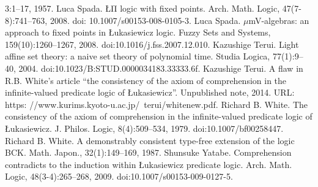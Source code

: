 3:1–17, 1957.
 Luca Spada. ŁΠ logic with fixed points. Arch. Math. Logic, 47(7-8):741–763, 2008. doi:
10.1007/s00153-008-0105-3.
 Luca Spada. \ensuremath{\mu}mV-algebras: an approach to fixed points in Łukasiewicz logic. Fuzzy Sets and
Systems, 159(10):1260–1267, 2008. doi:10.1016/j.fss.2007.12.010.
 Kazushige Terui. Light affine set theory: a naive set theory of polynomial time. Studia Logica,
77(1):9–40, 2004. doi:10.1023/B:STUD.0000034183.33333.6f.
 Kazushige Terui. A flaw in R.B. White’s article “the consistency of the axiom of comprehension
in the infinite-valued predicate logic of Łukasiewicz”. Unpublished note, 2014. URL: https:
//www.kurims.kyoto-u.ac.jp/~terui/whitenew.pdf.
 Richard B. White. The consistency of the axiom of comprehension in the infinite-valued
predicate logic of Łukasiewicz. J. Philos. Logic, 8(4):509–534, 1979. doi:10.1007/bf00258447.
 Richard B. White. A demonstrably consistent type-free extension of the logic BCK. Math.
Japon., 32(1):149–169, 1987.
 Shunsuke Yatabe. Comprehension contradicts to the induction within Łukasiewicz predicate
logic. Arch. Math. Logic, 48(3-4):265–268, 2009. doi:10.1007/s00153-009-0127-5.
